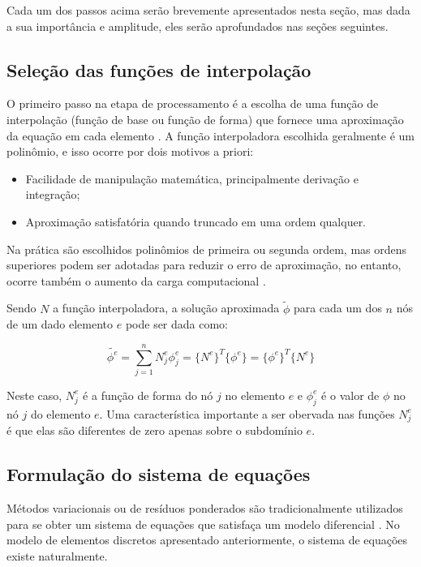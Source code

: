 \documentclass[
    12pt,               %
    openright,          %
    oneside,
    a4paper,            %
    english,            %
    french,             %
    spanish,            %
    brazil              %
    ]{abntex2}
\begin{document}
Cada um dos passos acima serão brevemente apresentados nesta seção, mas dada a sua importância e amplitude, eles serão aprofundados nas seções seguintes.

\subsection{Seleção das funções de interpolação}
O primeiro passo na etapa de processamento é a escolha de uma função de interpolação (função de base ou função de forma) \cite[p. 37]{volakis} que fornece uma aproximação da equação em cada elemento \cite[p. 32]{jin}. 
A função interpoladora escolhida geralmente é um polinômio, e isso ocorre por dois motivos a priori: \cite[p. 77]{desai}

\begin{itemize}  
\item Facilidade de manipulação matemática, principalmente derivação e integração;
\item Aproximação satisfatória quando truncado em uma ordem qualquer.
\end{itemize}

Na prática são escolhidos polinômios de primeira ou segunda ordem, mas ordens superiores podem ser adotadas para reduzir o erro de aproximação, no entanto, ocorre também o aumento da carga computacional \cite[p. 32]{jin}.

Sendo $N$ a função interpoladora, a solução aproximada $\tilde{\phi}$ para cada um dos $n$ nós de um dado elemento $e$ pode ser dada como:

 \begin{equation}
    \label{eq:interpol}
        \tilde{\phi^e} = \sum_{j=1}^{n}{N_j^e \phi_j^e} = 
        \{N^e\}^T \{\phi^e\} = \{\phi^e\}^T \{N^e\}
 \end{equation}

Neste caso, $N_j^e$ é a função de forma do nó $j$ no elemento $e$ e $\phi_j^e$ é o valor de $\phi$ no nó $j$ do elemento $e$.
Uma característica importante a ser obervada nas funções $N_j^e$ é que elas são diferentes de zero apenas sobre o subdomínio $e$.

\subsection{Formulação do sistema de equações}
Métodos variacionais ou de resíduos ponderados são tradicionalmente utilizados para se obter um sistema de equações que satisfaça um modelo diferencial \cite[p. 34]{jin}. No modelo de elementos discretos apresentado anteriormente, o sistema de equações existe naturalmente.
\end{document}
